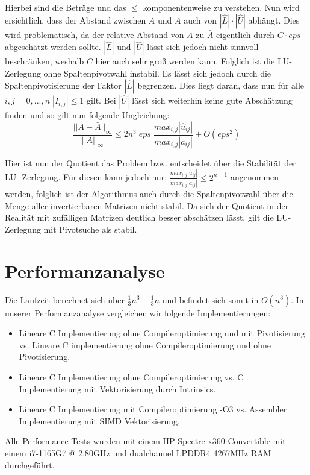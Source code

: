 \documentclass[course=erap]{aspdoc}
\begin{document}
Hierbei sind die Beträge und das $\leq$ komponentenweise zu verstehen.								
Nun wird ersichtlich, dass der Abstand zwischen $A$ und $\bar{A}$ auch von $|\hat{L}| \cdot |\hat{U}|$
abhängt. Dies wird problematisch, da der relative Abstand von $A$ zu $\bar{A}$ eigentlich durch 
$C\cdot eps$ abgeschätzt werden sollte. $|\hat{L}|$ und $|\hat{U}|$ lässt sich jedoch nicht sinnvoll 
beschränken, weshalb $C$ hier auch sehr groß werden kann.
Folglich ist die LU-Zerlegung ohne Spaltenpivotwahl instabil. Es lässt sich jedoch durch die Spaltenpivotisierung 
der Faktor $|\hat{L}|$  begrenzen. Dies liegt daran, dass nun für alle $i,j = 0,...,n\; |I_{i,j}| \leq 1$ gilt. 
Bei $|\hat{U}|$ lässt sich weiterhin keine gute Abschätzung finden und so gilt nun folgende Ungleichung:  
  \begin{equation}
    \label{eg3}
    \frac{||A - \bar{A}||_\infty}{||A||_\infty} \leq 2n^3 \; eps \;\frac{max_{i,j}| \hat{u}_{ij}|}{max_{i,j}|a_{ij}|} + O(eps^2)
  \end{equation}

Hier ist nun der Quotient das Problem bzw. entscheidet über die Stabilität der LU-
Zerlegung. Für diesen kann jedoch nur: $\frac{max_{i,j}| \hat{u}_{ij}|}{max_{i,j}|a_{ij}|} \leq 2^{n-1}$ angenommen 
werden, folglich ist der Algorithmus auch durch die Spaltenpivotwahl über die Menge 
aller invertierbaren Matrizen nicht stabil. Da sich der Quotient in der Realität mit zufälligen Matrizen deutlich 
besser abschätzen lässt, gilt die LU-Zerlegung mit Pivotsuche als stabil.




\section{Performanzanalyse}
\label{Performanzanalyse}
Die Laufzeit berechnet sich über  $ \frac{1}{3}n^3 -\frac{1}{3} n $ und befindet sich somit in $O(n^3)$. \cite{LULaufzeit}
In unserer Performanzanalyse vergleichen wir folgende Implementierungen:\\
\begin{itemize}
\item Lineare C Implementierung ohne Compileroptimierung und mit Pivotisierung vs. Lineare C implementierung ohne Compileroptimierung und ohne Pivotisierung. 
\item Lineare C Implementierung ohne Compileroptimierung vs. C Implementierung mit Vektorisierung durch Intrinsics. 
\item Lineare C Implementierung mit Compileroptimierung -O3 vs. Assembler Implementierung mit SIMD Vektorisierung.
\end{itemize}
Alle Performance Tests wurden mit einem HP Spectre x360 Convertible mit einem i7-1165G7 @ 2.80GHz und dualchannel LPDDR4 4267MHz RAM durchgeführt. 
\end{document}
